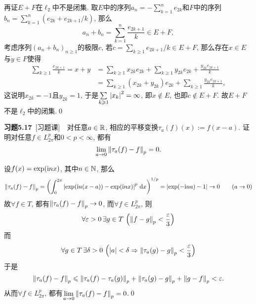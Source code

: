 \begin{Proof}
	再证$ E+F $在$ \ell_2 $中不是闭集. 取$ E $中的序列$ a_n=-\sum\limits_{k=1}^ne_{2k} $和$ F $中的序列$ b_n=\sum\limits_{k=1}^n(e_{2k}+e_{2k+1}/k) $, 那么
	\[
	a_n+b_n=\sum_{k=1}^n\frac{e_{2k+1}}{k}\in E+F,
	\]
	考虑序列$ (a_n+b_n)_{n\geqslant 1} $的极限$ c $, 若$ c=\sum\limits_{k\geqslant 1}e_{2k+1}/k\in E+F $, 那么存在$ x\in E $与$ y\in F $使得
	\[
	\begin{aligned}
	\sum_{k\geqslant 1}\frac{e_{2k+1}}{k}=x+y&=\sum_{k\geqslant 1}x_{2k}e_{2k}+\sum_{k\geqslant 1}y_{2k}e_{2k}+\frac{y_{2k}e_{2k+1}}{k}\\
	&=\sum_{k\geqslant 1}(x_{2k}+y_{2k})e_{2k}+\sum_{k\geqslant 1}\frac{y_{2k}e_{2k+1}}{k},
	\end{aligned}
	\]
	这说明$ x_{2k}=-1 $且$ y_{2k}=1 $, 于是$ \sum\limits_{k\geqslant 1}\left| x_k \right| ^2=\infty $, 即$ x\notin E $, 也即$ c\notin E+F $. 故$ E+F $不是$ \ell_2 $中的闭集.\qed
	\end{Proof}
	
	\textbf{习题5.17}\ [习题课]\ \ 对任意$ a\in\mathbb{R} $, 相应的平移变换$ \tau_a(f)(x):=f(x-a) $. 证明对任意$ f\in L_{2\pi}^p $和$ 0<p<\infty $, 都有
	\[
	\lim_{a\to 0}\left\| \tau_a(f)-f \right\|_p=0.
	\]
	\begin{Proof}
	设$ f(x)=\exp(\mathrm{i} nx) $, 其中$ n\in\mathbb{N} $, 那么
	\[
	\left\| \tau_a(f)-f \right\|_p=\left(\int_0^{2\pi}\left| \exp(\mathrm{i} n(x-a))-\exp(\mathrm{i} nx) \right| ^p\,\mathrm{d} x\right)^{1/p}=\left| \exp(-\mathrm{i} na)-1 \right| \to 0\qquad (a\to 0)
	\]
	故$ \forall f\in T $, 都有$ \left\| \tau_a(f)-f \right\|_p\to 0 $, 而$ \forall f\in L_{2\pi}^p $, 则
	\[
	\forall\varepsilon>0\,\exists g\in T\,\left(\left\| f-g \right\|_p<\frac{\varepsilon}{3}\right)
	\]
	而
	\[
	\forall g\in T\,\exists\delta>0\,\left(\left| a \right| <\delta\Rightarrow\left\| \tau_a(g)-g \right\|_p<\frac{\varepsilon}{3}\right)
	\]
	于是
	\[
	\left\| \tau_a(f)-f \right\|_p\leqslant\left\| \tau_a(f)-\tau_a(g) \right\|_p+\left\| \tau_a(g)-g \right\|_p+\left\| g-f \right\|_p<\varepsilon.
	\]
	从而$ \forall f\in L_{2\pi}^p $, 都有$ \lim\limits_{a\to 0}\left\| \tau_a(f)-f \right\|_p=0 $.\qed
	\end{Proof}
	
